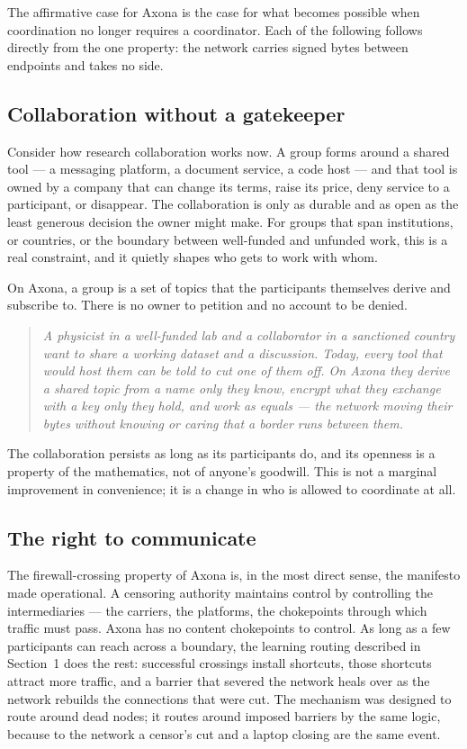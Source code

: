 \documentclass[nobib,justified]{tufte-handout}
\newcommand{\pullquote}[1]{%
  \begin{quote}\itshape\color{rust} #1 \end{quote}}
\begin{document}
The affirmative case for Axona is the case for what becomes possible when
coordination no longer requires a coordinator. Each of the following follows
directly from the one property: the network carries signed bytes between
endpoints and takes no side.

\subsection{Collaboration without a gatekeeper}

Consider how research collaboration works now. A group forms around a shared
tool --- a messaging platform, a document service, a code host --- and that tool
is owned by a company that can change its terms, raise its price, deny service
to a participant, or disappear. The collaboration is only as durable and as open
as the least generous decision the owner might make. For groups that span
institutions, or countries, or the boundary between well-funded and unfunded
work, this is a real constraint, and it quietly shapes who gets to work with
whom.

On Axona, a group is a set of topics that the participants themselves derive and
subscribe to. There is no owner to petition and no account to be denied.

\pullquote{A physicist in a well-funded lab and a collaborator in a sanctioned
country want to share a working dataset and a discussion. Today, every tool that
would host them can be told to cut one of them off. On Axona they derive a shared
topic from a name only they know, encrypt what they exchange with a key only they
hold, and work as equals --- the network moving their bytes without knowing or
caring that a border runs between them.}

The collaboration persists as long as its participants do, and its openness is a
property of the mathematics, not of anyone's goodwill. This is not a marginal
improvement in convenience; it is a change in who is allowed to coordinate at
all.

\subsection{The right to communicate}

The firewall-crossing property of Axona is, in the most direct sense, the
manifesto made operational. A censoring authority maintains control by
controlling the intermediaries --- the carriers, the platforms, the chokepoints
through which traffic must pass. Axona has no content chokepoints to control. As
long as a few participants can reach across a boundary, the learning routing
described in Section~1 does the rest: successful crossings install shortcuts,
those shortcuts attract more traffic, and a barrier that severed the network
heals over as the network rebuilds the connections that were cut. The mechanism
was designed to route around dead nodes; it routes around imposed barriers by the
same logic, because to the network a censor's cut and a laptop closing are the
same event.
\end{document}
